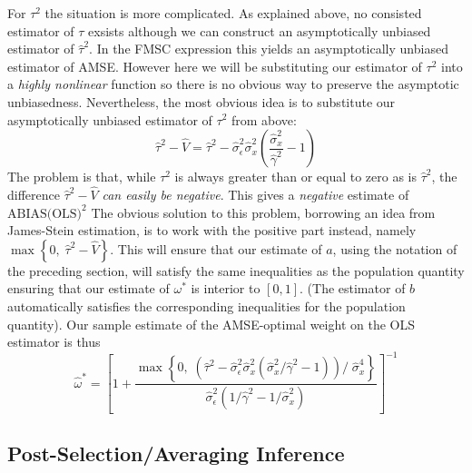 \documentclass[12pt]{article}
\theoremstyle{definition}
\begin{document}
For $\tau^2$ the situation is more complicated. As explained above, no consisted estimator of $\tau$ exsists although we can construct an asymptotically unbiased estimator of $\widehat{\tau}^2$. In the FMSC expression this yields an asymptotically unbiased estimator of AMSE. However here we will be substituting our estimator of $\tau^2$ into a \emph{highly nonlinear} function so there is no obvious way to preserve the asymptotic unbiasedness. Nevertheless, the most obvious idea is to substitute our asymptotically unbiased estimator of $\tau^2$ from above: 
$$\widehat{\tau}^2 - \widehat{V} = \widehat{\tau}^2 - \widehat{\sigma}_\epsilon^2\widehat{\sigma}_x^2  \left(\frac{\widehat{\sigma}_x^2}{\widehat{\gamma}^2} - 1 \right)$$
The problem is that, while $\tau^2$ is always greater than or equal to zero as is $\widehat{\tau}^2$, the difference $\widehat{\tau}^2 - \widehat{V}$ \emph{can easily be negative}. This gives a \emph{negative} estimate of $\mbox{ABIAS(OLS)}^2$ The obvious solution to this problem, borrowing an idea from James-Stein estimation, is to work with the positive part instead, namely $\max\left\{0, \; \widehat{\tau}^2 - \widehat{V}\right\}$. This will ensure that our estimate of $a$, using the notation of the preceding section, will satisfy the same inequalities as the population quantity ensuring that our estimate of $\omega^*$ is interior to $[0,1]$. (The estimator of $b$ automatically satisfies the corresponding inequalities for the population quantity). Our sample estimate of the AMSE-optimal weight on the OLS estimator is thus
  $$\widehat{\omega }^* = \left[1 + \frac{\max \left\{0, \; \left(\widehat{\tau}^2 - \widehat{\sigma}_\epsilon^2\widehat{\sigma}_x^2  \left(\widehat{\sigma}_x^2/\widehat{\gamma}^2 - 1 \right) \right)/\;\widehat{\sigma}_x^4 \right\}}{\widehat{\sigma}_\epsilon^2 (1/\widehat{\gamma}^2 - 1/\widehat{\sigma}_x^2)}\right]^{-1}$$


\subsection{Post-Selection/Averaging Inference} %
\label{sub:valid_confidence_interval_for_ols_vs_2sls_example}
\end{document}

